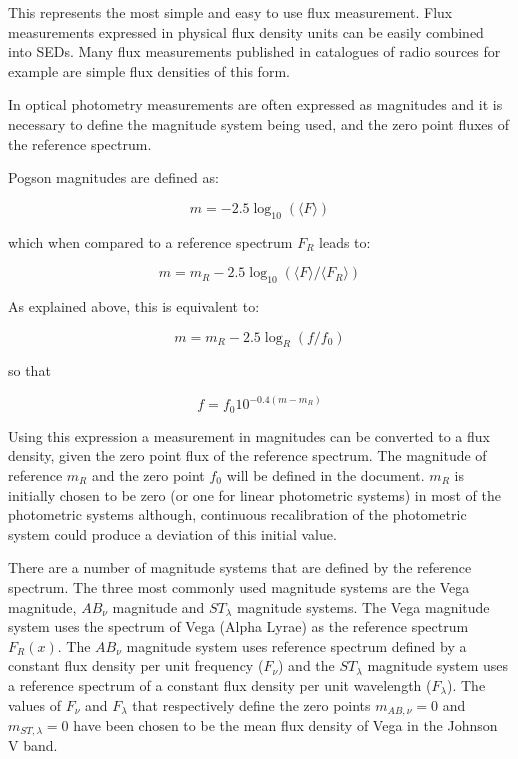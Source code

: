 \documentclass[11pt,a4paper]{ivoa}
\begin{document}
This represents the most simple and easy to use flux measurement. Flux 
measurements expressed in physical flux density units can be easily combined 
into SEDs. Many flux measurements published in catalogues of radio sources 
for example are simple flux densities of this form.
\par

In optical photometry measurements are often expressed as magnitudes and it 
is necessary to define the magnitude system being used, and the zero point 
fluxes of the reference spectrum.
\par

Pogson magnitudes are defined as:

\begin{equation} \label{eq:4}
m = -2.5\log_{10} (\langle F\rangle ) 
\end{equation}

which when compared to a reference spectrum $F_R$ leads to:

\begin{equation} \label{eq:5}
m = m_R -2.5 \log_{10} \left(\langle F\rangle /\langle F_R \rangle \right) 
\end{equation}

As explained above, this is equivalent to:

\begin{equation} \label{eq:6}
m = m_R - 2.5 \log_{R} (f/f_0 )
\end{equation}


so that

\begin{equation} \label{eq:7}
f = f_0 10^{-0.4(m - m_{R})}
\end{equation}


Using this expression a measurement in magnitudes can be converted to a 
flux density, given the zero point flux of the reference spectrum.  The 
magnitude of reference $m_{R}$ and the zero point $f_0$ will be defined 
in the document. $m_{R}$ is initially chosen to be zero (or one for 
linear photometric systems) in most of the photometric systems although, 
continuous recalibration of the photometric system could 
produce a deviation of this initial value.
\par

There are a number of magnitude systems that are defined by the reference 
spectrum. The three most commonly used magnitude systems are the Vega 
magnitude, $AB_{\nu }$ magnitude and $ST_{\lambda }$ magnitude systems. 
The Vega magnitude system uses the spectrum of Vega (Alpha Lyrae) as the 
reference spectrum $F_R (x)$. The $AB_{\nu }$ magnitude system uses 
reference spectrum defined by a constant flux density per unit frequency 
($F_{\nu }$) and the
$ST_{\lambda }$ magnitude system uses a reference spectrum of a constant 
flux density per unit wavelength ($F_{\lambda }$). The values of $F_{\nu }$ 
and $F_{\lambda }$ that respectively define the zero points
$m_{AB,\nu } =0$ and
$m_{ST,\lambda } =0$ have been chosen to be the mean flux density of 
Vega in the Johnson V band.
\end{document}
